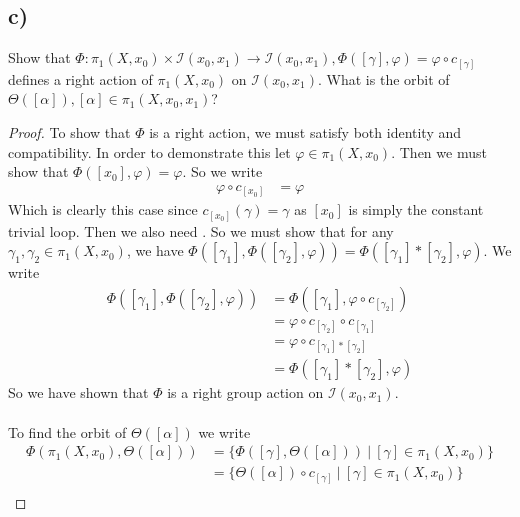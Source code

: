 \documentclass{article}
\theoremstyle{definition}
\begin{document}
    \subsection*{c)}
        \begin{mdframed}
            Show that $\varPhi : \pi_1(X,x_0) \times \mathcal I(x_0,x_1) \rightarrow \mathcal I(x_0,x_1), \varPhi([\gamma],\varphi) = \varphi \circ c_{[\gamma]}$
            defines a right action of $\pi_1(X,x_0)$ on $\mathcal{I}(x_0,x_1)$. What is the orbit of $\Theta([\alpha]), [\alpha]\in\pi_1(X,x_0,x_1)$?
        \end{mdframed}
        \begin{proof}
            To show that $\varPhi$ is a right action, we must satisfy both identity and compatibility. 
            In order to demonstrate this let $\varphi \in\pi_1(X,x_0)$. Then we must show that 
            $\varPhi([x_0], \varphi) = \varphi$. So we write 
            \begin{align*}
                \varphi \circ c_{[x_0]} & = \varphi
            \end{align*}
            Which is clearly this case since $c_{[x_0]}(\gamma) = \gamma$ as $[x_0]$ is simply the constant trivial loop. Then 
            we also need . So we must show that for any $\gamma_1, \gamma_2 \in \pi_1(X,x_0)$,
            we have $\varPhi([\gamma_1], \varPhi([\gamma_2],\varphi)) = \varPhi([\gamma_1] * [\gamma_2], \varphi)$.
            We write 
            \begin{align*}
                \varPhi([\gamma_1], \varPhi([\gamma_2],\varphi)) & =  \varPhi([\gamma_1], \varphi \circ c_{[\gamma_2]})\\
                &=\varphi \circ c_{[\gamma_2]} \circ c_{[\gamma_1]} \\
                &= \varphi \circ c_{[\gamma_1] * [\gamma_2]} \\
                &= \varPhi([\gamma_1] * [\gamma_2], \varphi)
            \end{align*}
            So we have shown that $\varPhi$ is a right group action on $\mathcal{I}(x_0,x_1)$.\\\\
            To find the orbit of $\Theta([\alpha])$ we write
            \begin{align*}
                \varPhi(\pi_1(X,x_0), \Theta([\alpha])) &= \{\varPhi([\gamma], \Theta([\alpha])) \ | \ [\gamma] \in \pi_1(X,x_0)\} \\
                &= \{\Theta([\alpha]) \circ c_{[\gamma]} \ | \ [\gamma] \in \pi_1(X,x_0)\} \\ 
            \end{align*}
        \end{proof}
\end{document}
